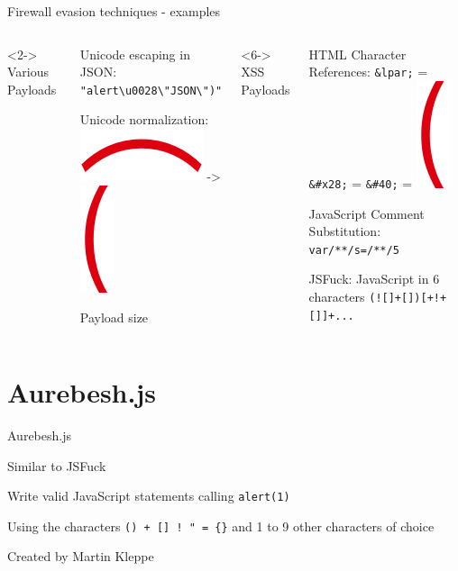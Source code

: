 \documentclass[aspectratio=169]{beamer}
\begin{document}
\begin{frame}[fragile]{Firewall evasion techniques - examples}
	\begin{columns}
		<2->
		Various Payloads
		\begin{vfilleditems}
			\item<3-> Unicode escaping in JSON: \verb|"alert\u0028\"JSON\")"|
			\item<4-> Unicode normalization: \  \includegraphics[width=.07\linewidth]{UFE35.png} -> \includegraphics[width=.02\linewidth]{U0028.png}
			\item<5-> Payload size
		\end{vfilleditems}
		<6->
		XSS Payloads
		\begin{vfilleditems}
			\item<7-> HTML Character References: \verb|&lpar;| {\color{red}=} \verb|&#x28;| {\color{red}=} \verb|&#40;| {\color{red}=} \includegraphics[width=.02\linewidth]{U0028.png}
			\item<8-> JavaScript Comment Substitution: \verb|var/**/s=/**/5|
			\item<9-> JSFuck: JavaScript in 6 characters \verb|(![]+[])[+!+[]]+...| \  \cite{mk/jsfuck}
		\end{vfilleditems}
	\end{columns}
\end{frame}


\section{Aurebesh.js}

\begin{frame}[fragile]{Aurebesh.js}
	\begin{vfilleditems}
		\item<2-> Similar to JSFuck \cite{mk/jsfuck}
		\item<3-> Write valid JavaScript statements calling \verb|alert(1)|
		\item<4-> Using the characters \verb|() + [] ! " = {}| and 1 to 9 other characters of choice
		\item<5-> Created by Martin Kleppe \cite{mk/aurebesh}
	\end{vfilleditems}
\end{frame}
\end{document}
